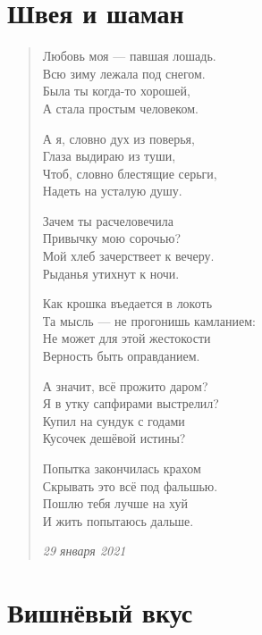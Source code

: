 \documentclass[a4paper,12pt,fleqn]{book}\usepackage{polyglossia}\setdefaultlanguage[babelshorthands=true]{russian}\setotherlanguage{english}\defaultfontfeatures{Ligatures=TeX,Mapping=tex-text}\usepackage{xcolor}\newcommand{\ml}[3]{#2}
\begin{document}
\section{Швея и шаман}

\begin{verse}
Любовь моя --- павшая лошадь. \\
Всю зиму лежала под снегом. \\
Была ты когда-то хорошей, \\
А стала простым человеком.

А я, словно дух из поверья, \\
Глаза выдираю из туши, \\
Чтоб, словно блестящие серьги, \\
Надеть на усталую душу. 

Зачем ты расчеловечила \\
Привычку мою сорочью? \\
Мой хлеб зачерствеет к вечеру. \\
Рыданья утихнут к ночи. 

Как крошка въедается в локоть \\
Та мысль --- не прогонишь камланием: \\
Не может для этой жестокости \\
Верность быть оправданием. 

А значит, всё прожито даром? \\
Я в утку сапфирами выстрелил? \\
Купил на сундук с годами \\
Кусочек дешёвой истины? 

Попытка закончилась крахом \\
Скрывать это всё под фальшью. \\
Пошлю тебя лучше на хуй \\
И жить попытаюсь дальше. 

\emph{29 января 2021}
\end{verse}
\newpage

\section{Вишнёвый вкус}
\end{document}
